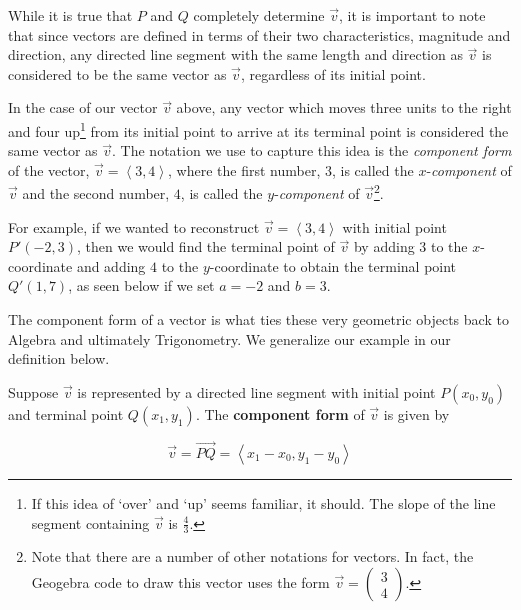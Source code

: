 \documentclass{ximera}
\begin{document}
\begin{center} 
\end{center}

While it is true that $P$ and $Q$ completely determine $\overrightarrow{v}$, it is important to note that since vectors are defined in terms of their two characteristics,  magnitude and direction, any directed line segment with the same length and direction as $\overrightarrow{v}$ is considered to be the same vector as $\overrightarrow{v}$, regardless of its initial point.

 In the case of our vector $\overrightarrow{v}$ above, any vector which moves three units to the right and four up\footnote{If this idea of `over' and `up' seems familiar, it should.  The slope of the line segment containing $\overrightarrow{v}$ is  $\frac{4}{3}$.} from its initial point to arrive at its terminal point is considered the same vector as $\overrightarrow{v}$.  The notation we use to capture this idea is the  \textit{component form} of the vector, $\overrightarrow{v} = \left<3,4\right>$, where the first number, $3$, is called the $x$-\textit{component}  of $\overrightarrow{v}$ and the second number, $4$, is called the $y$-\textit{component}  of $\overrightarrow{v}$\footnote{Note that there are a number of other notations for vectors.  In fact, the Geogebra code to draw this vector uses the form 
$\overrightarrow{v} = \left(\begin{array}{cc}
3 \\ 4 \end{array}\right).$}.  
 
 For example, if we wanted to reconstruct $\overrightarrow{v} = \left<3,4\right>$ with initial point $P'(-2,3)$, then we would find the terminal point of $\overrightarrow{v}$ by adding $3$ to the $x$-coordinate and adding $4$ to the $y$-coordinate to obtain the terminal point $Q'(1,7)$, as seen below if we set $a=-2$ and $b=3$.

\begin{center} 
\end{center}

The component form of a vector is what ties these very geometric objects back to Algebra and ultimately Trigonometry.  We generalize our example in our definition below.

\begin{definition} \label{componentformvector}  Suppose $\overrightarrow{v}$ is represented by a directed line segment with initial point $P\left(x_0, y_0\right)$ and terminal point $Q\left(x_1, y_1\right)$.  The \textbf{component form} of $\overrightarrow{v}$ is given by 

\[ \overrightarrow{v} = \overrightarrow{PQ} = \left< x_1 - x_0, y_1 - y_0 \right> \]


\end{definition}
\end{document}
